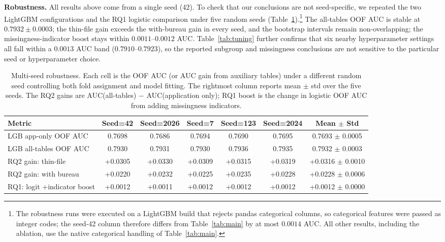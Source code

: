 \documentclass[10pt]{article}
\begin{document}
\textbf{Robustness.} All results above come from a single seed (42). To check that our conclusions are not seed-specific, we repeated the two LightGBM configurations and the RQ1 logistic comparison under five random seeds (Table~\ref{tab:robustness}).\footnote{The robustness runs were executed on a LightGBM build that rejects pandas categorical columns, so categorical features were passed as integer codes; the seed-42 column therefore differs from Table~\ref{tab:main} by at most $0.0014$ AUC. All other results, including the ablation, use the native categorical handling of Table~\ref{tab:main}.} The all-tables OOF AUC is stable at $0.7932 \pm 0.0003$; the thin-file gain exceeds the with-bureau gain in every seed, and the bootstrap intervals remain non-overlapping; the missingness-indicator boost stays within $0.0011$--$0.0012$ AUC. Table~\ref{tab:tuning} further confirms that six nearby hyperparameter settings all fall within a $0.0013$ AUC band ($0.7910$--$0.7923$), so the reported subgroup and missingness conclusions are not sensitive to the particular seed or hyperparameter choice.

\begin{table}[t]\centering\small
\caption{Multi-seed robustness. Each cell is the OOF AUC (or AUC gain from auxiliary tables) under a different random seed controlling both fold assignment and model fitting. The rightmost column reports mean $\pm$ std over the five seeds. The RQ2 gains are AUC(all-tables) $-$ AUC(application only); RQ1 boost is the change in logistic OOF AUC from adding missingness indicators.}\label{tab:robustness}
\begin{tabular}{lccccc c}
\toprule
Metric & Seed=42 & Seed=2026 & Seed=7 & Seed=123 & Seed=2024 & Mean $\pm$ Std \\
\midrule
LGB app-only OOF AUC       & 0.7698 & 0.7686 & 0.7694 & 0.7690 & 0.7695 & 0.7693 $\pm$ 0.0005 \\
LGB all-tables OOF AUC    & 0.7930 & 0.7931 & 0.7930 & 0.7936 & 0.7935 & 0.7932 $\pm$ 0.0003 \\
\addlinespace
RQ2 gain: thin-file        & +0.0305 & +0.0330 & +0.0309 & +0.0315 & +0.0319 & +0.0316 $\pm$ 0.0010 \\
RQ2 gain: with bureau      & +0.0220 & +0.0232 & +0.0225 & +0.0235 & +0.0228 & +0.0228 $\pm$ 0.0006 \\
\addlinespace
RQ1: logit +indicator boost & +0.0012 & +0.0011 & +0.0012 & +0.0012 & +0.0012 & +0.0012 $\pm$ 0.0000 \\
\bottomrule
\end{tabular}
\end{table}
\end{document}
